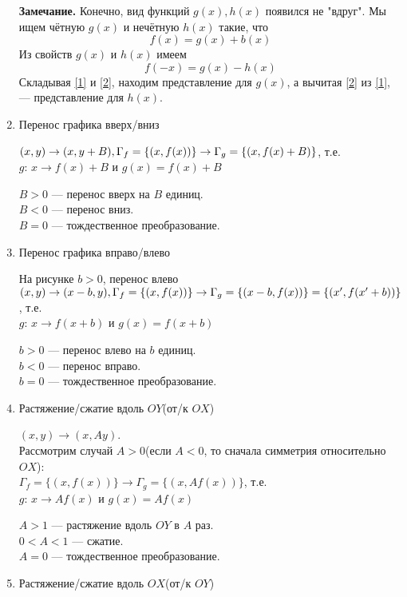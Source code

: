 \documentclass{article}
\begin{document}
\begin{enumerate}
        \textbf{Замечание.} Конечно, вид функций \(g(x), h(x)\) появился не "вдруг". Мы ищем чётную \(g(x)\) и нечётную \(h(x)\) такие, что
        \begin{equation}\label{1}
            f(x)=g(x)+b(x)
        \end{equation}
        Из свойств \(g(x)\) и \(h(x)\) имеем
        \begin{equation}\label{2}
            f(-x)=g(x)-h(x)
        \end{equation}
        Складывая \ref{1} и \ref{2}, находим представление для \(g(x)\), а вычитая \ref{2} из \ref{1}, --- представление для \(h(x)\).
        \item Перенос графика вверх/вниз

        \((x,y)\rightarrow(x, y+B),\\ \Gamma_f=\{(x,f(x))\} \rightarrow \Gamma_g=\{(x,f(x)+B)\}\), т.е.\\
        \(g\): \(x\rightarrow f(x)+B\) и \(g(x)=f(x)+B\)

        \(B>0\) --- перенос вверх на \(B\) единиц.\\
        \(B<0\) --- перенос вниз.\\
        \(B=0\) --- тождественное преобразование.
        \item Перенос графика вправо/влево

        На рисунке \(b>0\), перенос влево \((x,y)\rightarrow (x-b,y),\\
        \Gamma_f=\{(x,f(x))\}\rightarrow \Gamma_g = \{(x-b,f(x))\}=\{(x',f(x'+b))\}\), т.е.\\
        \(g\): \(x\rightarrow f(x+b)\) и \(g(x)=f(x+b)\)

        \(b>0\) --- перенос влево на \(b\) единиц.\\
        \(b<0\) --- перенос вправо.\\
        \(b=0\) --- тождественное преобразование.
        \item Растяжение/сжатие вдоль \(OY\)(от/к \(OX\))

        \((x,y)\rightarrow (x,Ay)\).\\
        Рассмотрим случай \(A>0\)(если \(A<0\), то сначала симметрия относительно \(OX\)):\\
        \(\Gamma_f=\{(x,f(x))\}\rightarrow \Gamma_g=\{(x,Af(x))\}\), т.е.\\
        \(g\): \(x \rightarrow Af(x)\) и \(g(x)=Af(x)\)

        \(A>1\) --- растяжение вдоль \(OY\) в \(A\) раз.\\
        \(0<A<1\) --- сжатие.\\
        \(A=0\) --- тождественное преобразование.
        \item Растяжение/сжатие вдоль \(OX\)(от/к \(OY\))
        

\end{enumerate}
\end{document}
